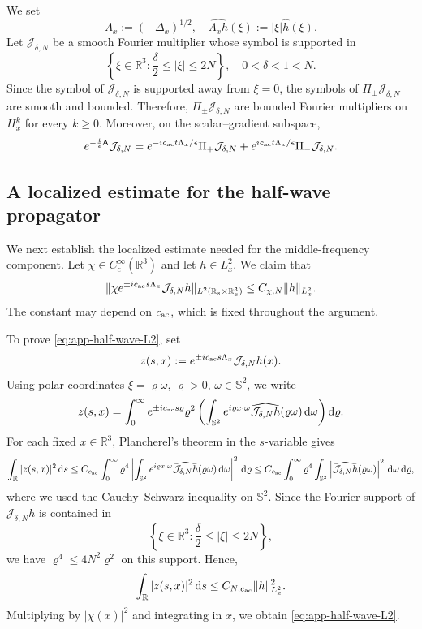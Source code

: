 \documentclass[10pt,reqno]{amsart}
\numberwithin{equation}{section}
\newcommand{\lt}{\left}
\newcommand{\rt}{\right}
\newcommand{\R}{\mathbb R}
\newcommand{\bq}{\begin{equation}}
\newcommand{\eq}{\end{equation}}
\newcommand{\calJ}{\mathcal J}
\newcommand{\ds}{\textnormal{d}s}
\begin{document}
We set
\[
\Lambda_x := (-\Delta_x)^{1/2}, \quad \widehat{ \Lambda_x h }(\xi) := |\xi| \widehat h(\xi).
\]
Let $\calJ_{\delta,N}$ be a smooth Fourier multiplier whose symbol is
supported in
\[
\lt\{ \xi\in\R^3 : \frac{\delta}{2} \le |\xi| \le 2N \rt\}, \quad 0<\delta<1<N.
\]
Since the symbol of $\calJ_{\delta,N}$ is supported away from $\xi=0$, the symbols of $\Pi_\pm \calJ_{\delta,N}$ are smooth and bounded. Therefore, $\Pi_\pm\calJ_{\delta,N}$ are bounded Fourier multipliers on $H^k_x$ for every $k\ge0$. Moreover, on the scalar--gradient subspace,
\bq\label{eq:app-ac-group-dec}
e^{-\frac{t}{\epsilon}\mathsf A} \calJ_{\delta,N} = e^{-ic_{\rm ac}t\Lambda_x/\epsilon} \Pi_+ \calJ_{\delta,N} + e^{ic_{\rm ac}t\Lambda_x/\epsilon} \Pi_- \calJ_{\delta,N}.
\eq
 
 

%
%
%
%
%
%
%
%
%
%
\subsection{A localized estimate for the half-wave propagator}


We next establish the localized estimate needed for the middle-frequency component. Let $\chi \in C_c^\infty(\R^3)$ and let $h\in L^2_x$. We claim that
\bq\label{eq:app-half-wave-L2}
\| \chi e^{\pm ic_{\rm ac}s\Lambda_x} \calJ_{\delta,N} h \|_{L^2(\R_s\times\R^3_x)} \le C_{\chi,N} \| h \|_{L^2_x}.
\eq
The constant may depend on $c_{\rm ac}$, which is fixed throughout the argument.

To prove \eqref{eq:app-half-wave-L2}, set
\[
z(s,x) := e^{\pm ic_{\rm ac}s\Lambda_x} \calJ_{\delta,N} h(x).
\]
Using polar coordinates $\xi = \varrho \omega$, $\varrho>0$, $\omega\in\mathbb S^2$, we write
\[
z(s,x) = \int_0^\infty e^{\pm ic_{\rm ac}s\varrho} \varrho^2 \lt( \int_{\mathbb S^2} e^{i\varrho x\cdot\omega} \widehat{ \calJ_{\delta,N}h } (\varrho\omega) \,\textnormal{d}\omega \rt) \textnormal{d}\varrho.
\]
For each fixed $x\in\R^3$, Plancherel's theorem in the $s$-variable gives
\[
\int_{\R} |z(s,x)|^2 \,\ds \le C_{c_{\rm ac}} \int_0^\infty \varrho^4 \lt| \int_{\mathbb S^2} e^{i\varrho x\cdot\omega} \widehat{ \calJ_{\delta,N}h } (\varrho\omega) \,\textnormal{d}\omega \rt|^2 \,\textnormal{d}\varrho
\le C_{c_{\rm ac}} \int_0^\infty \varrho^4 \int_{\mathbb S^2} \lt| \widehat{ \calJ_{\delta,N}h } (\varrho\omega) \rt|^2 \,\textnormal{d}\omega \,\textnormal{d}\varrho,
\]
where we used the Cauchy--Schwarz inequality on $\mathbb S^2$. Since the Fourier support of $\calJ_{\delta,N}h$ is contained in
\[
\lt\{ \xi\in\R^3 : \frac{\delta}{2} \le |\xi| \le 2N \rt\},
\]
we have $\varrho^4 \le 4N^2 \varrho^2$ on this support. Hence,
\[
\int_{\R} |z(s,x)|^2 \,\ds \le C_{N,c_{\rm ac}} \| h \|_{L^2_x}^2.
\]
Multiplying by $|\chi(x)|^2$ and integrating in $x$, we obtain \eqref{eq:app-half-wave-L2}.
\end{document}
